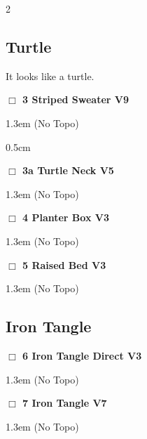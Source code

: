 \begin{multicols}{2}
\subsection*{Turtle}\label{bf:Turtle}
It looks like a turtle.\\
\needspace{2em}
\label{rt:Striped Sweater}
\colorbox{Goldenrod!50}{
\parbox{0.95\linewidth}{
\hspace{-1ex}\textbf{$\Box$
3 Striped Sweater V9  \warn
}}}
\begin{adjustwidth}{1.3em}{}			
  (No Topo)
\end{adjustwidth}
\begin{adjustwidth}{0.5cm}{}				
\needspace{4em}
\needspace{2em}
\label{vr:Turtle Neck}
\colorbox{RoyalBlue!20}{
\parbox{0.95\linewidth}{
\hspace{-1ex}\textbf{$\Box$
3a Turtle Neck V5  \warn
}}}
\begin{adjustwidth}{1.3em}{}			
  (No Topo)
\end{adjustwidth}
\end{adjustwidth}
\needspace{2em}
\label{rt:Planter Box}
\colorbox{green!20}{
\parbox{0.95\linewidth}{
\hspace{-1ex}\textbf{$\Box$
4 Planter Box V3  
}}}
\begin{adjustwidth}{1.3em}{}			
  (No Topo)
\end{adjustwidth}
\needspace{2em}
\label{rt:Raised Bed}
\colorbox{green!20}{
\parbox{0.95\linewidth}{
\hspace{-1ex}\textbf{$\Box$
5 Raised Bed V3  
}}}
\begin{adjustwidth}{1.3em}{}			
  (No Topo)
\end{adjustwidth}
\needspace{10em}
\subsection*{Iron Tangle}\label{bf:Iron Tangle}
\needspace{2em}
\label{rt:Iron Tangle Direct}
\colorbox{green!20}{
\parbox{0.95\linewidth}{
\hspace{-1ex}\textbf{$\Box$
6 Iron Tangle Direct V3  
}}}
\begin{adjustwidth}{1.3em}{}			
  (No Topo)
\end{adjustwidth}
\needspace{2em}
\label{rt:Iron Tangle}
\colorbox{Goldenrod!50}{
\parbox{0.95\linewidth}{
\hspace{-1ex}\textbf{$\Box$
7 Iron Tangle V7  
}}}
\begin{adjustwidth}{1.3em}{}			
  (No Topo)
\end{adjustwidth}
\newpage

\end{multicols}
